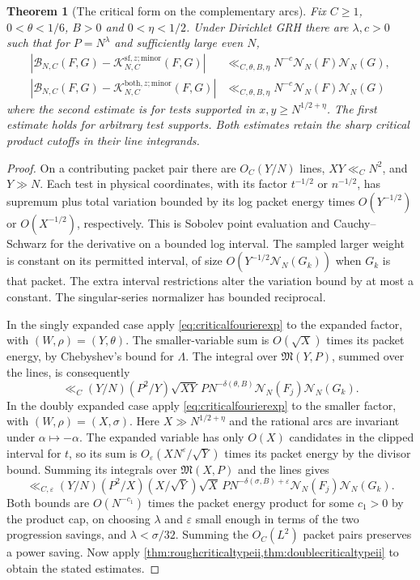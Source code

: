 \documentclass[11pt,a4paper]{article}
\numberwithin{equation}{section}
\newtheorem{theorem}{Theorem}[section]
\newcommand{\NN}{\mathcal N_N}
\begin{document}
\begin{theorem}[The critical form on the complementary arcs]
\label{thm:criticalminorarc}
Fix $C\ge1$, $0<\theta<1/6$, $B>0$ and $0<\eta<1/2$.
Under Dirichlet GRH there are $\lambda,c>0$ such that
for $P=N^\lambda$ and sufficiently large even $N$,
\begin{align*}
 \left|\mathcal B_{N,C}(F,G)
       -\mathcal K^{\mathrm{sf},z;\mathrm{minor}}_{N,C}(F,G)\right|
     &\ll_{C,\theta,B,\eta} N^{-c}\NN(F)\NN(G),\\
 \left|\mathcal B_{N,C}(F,G)
       -\mathcal K^{\mathrm{both},z;\mathrm{minor}}_{N,C}(F,G)\right|
     &\ll_{C,\theta,B,\eta} N^{-c}\NN(F)\NN(G)
\end{align*}
where the second estimate is for tests supported in
$x,y\ge N^{1/2+\eta}$. The first estimate holds for
arbitrary test supports. Both estimates retain the sharp
critical product cutoffs in their line integrands.
\end{theorem}

\begin{proof}
On a contributing packet pair there are $O_C(Y/N)$
lines, $XY\ll_C N^2$, and $Y\gg N$.
Each test in physical coordinates, with its factor
$t^{-1/2}$ or $n^{-1/2}$, has supremum plus total
variation bounded by its log packet energy times
$O(Y^{-1/2})$ or $O(X^{-1/2})$, respectively. This is
Sobolev point evaluation and Cauchy--Schwarz for the
derivative on a bounded log interval. The sampled
larger weight is constant on its permitted interval,
of size $O(Y^{-1/2}\NN(G_k))$ when $G_k$ is that packet.
The extra interval restrictions alter the variation
bound by at most a constant. The singular-series
normalizer has bounded reciprocal.

In the singly expanded case apply \cref{eq:criticalfourierexp}
to the expanded factor, with $(W,\rho)=(Y,\theta)$.
The smaller-variable sum is $O(\sqrt X)$ times its
packet energy, by Chebyshev's bound for $\Lambda$.
The integral over $\mathfrak M(Y,P)$, summed over the
lines, is consequently
\[
 \ll_C (Y/N)(P^2/Y)\sqrt{XY}\,P N^{-\delta(\theta,B)}
       \NN(F_j)\NN(G_k).
\]
In the doubly expanded case apply \cref{eq:criticalfourierexp}
to the smaller factor, with $(W,\rho)=(X,\sigma)$.
Here $X\gg N^{1/2+\eta}$ and the rational arcs are
invariant under $\alpha\mapsto-\alpha$. The expanded
variable has only $O(X)$ candidates in the clipped
interval for $t$, so its sum is
$O_\varepsilon(XN^\varepsilon/\sqrt Y)$ times its packet
energy by the divisor bound. Summing its integrals
over $\mathfrak M(X,P)$ and the lines gives
\[
 \ll_{C,\varepsilon} (Y/N)(P^2/X)(X/\sqrt Y)\sqrt X\,
       P N^{-\delta(\sigma,B)+\varepsilon}\NN(F_j)\NN(G_k).
\]
Both bounds are $O(N^{-c_1})$ times the packet energy
product for some $c_1>0$ by the product cap, on choosing
$\lambda$ and $\varepsilon$ small enough in terms of the
two progression savings, and $\lambda<\sigma/32$.
Summing the $O_C(L^2)$ packet pairs preserves a power
saving. Now apply \cref{thm:roughcriticaltypeii,thm:doublecriticaltypeii}
to obtain the stated estimates.
\end{proof}
\end{document}
